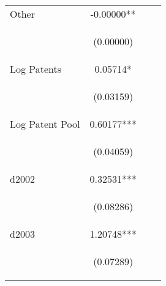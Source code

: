 \begin{center}
\begin{tabular}{lccc}
Other & -0.00000** &  &  \\
\vspace{4pt} & \begin{footnotesize}(0.00000)\end{footnotesize} & \begin{footnotesize}\end{footnotesize} & \begin{footnotesize}\end{footnotesize} \\
Log Patents & 0.05714* &  &  \\
\vspace{4pt} & \begin{footnotesize}(0.03159)\end{footnotesize} & \begin{footnotesize}\end{footnotesize} & \begin{footnotesize}\end{footnotesize} \\
Log Patent Pool & 0.60177*** &  &  \\
\vspace{4pt} & \begin{footnotesize}(0.04059)\end{footnotesize} & \begin{footnotesize}\end{footnotesize} & \begin{footnotesize}\end{footnotesize} \\
d2002 & 0.32531*** &  &  \\
\vspace{4pt} & \begin{footnotesize}(0.08286)\end{footnotesize} & \begin{footnotesize}\end{footnotesize} & \begin{footnotesize}\end{footnotesize} \\
d2003 & 1.20748*** &  &  \\
\vspace{4pt} & \begin{footnotesize}(0.07289)\end{footnotesize} & \begin{footnotesize}\end{footnotesize} & \begin{footnotesize}\end{footnotesize} \\

\end{tabular}
\end{center}
